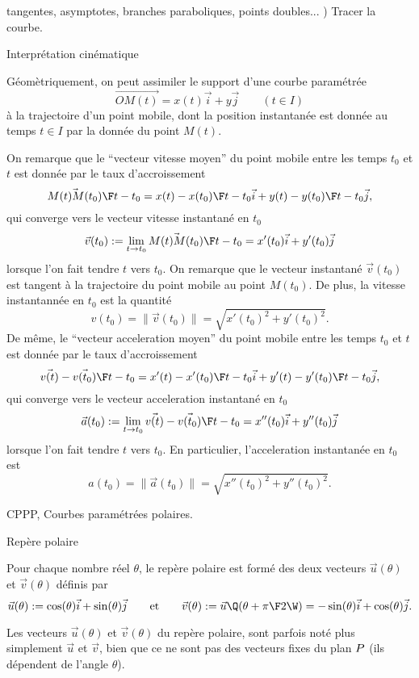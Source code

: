 \noindent\quad tangentes, asymptotes, branches paraboliques, points doubles...
\medskip
{}) Tracer la courbe.

\bigskip
\Concept [] Interprétation cinématique

\noindent
Géomètriquement, on peut assimiler le support d'une courbe paramétrée
$$
\vec{OM(t)}=x(t)\vec i+y\vec j\qquad(t\in I)
$$
à la trajectoire d'un point mobile, dont la position instantanée est donnée au temps $t\in I$ par la donnée du point $M(t)$. 

\bigskip
\noindent
On remarque que le ``vecteur vitesse moyen'' du point mobile entre les temps $t_0$ et $t$ est donnée par le taux d'accroissement 
$$
{\vec{M(t)M(t_0)}\F t-t_0}={x(t)-x(t_0)\F t-t_0}\vec i+{y(t)-y(t_0)\F t-t_0}\vec j, 
$$
qui converge vers le vecteur vitesse instantané en $t_0$ 
$$
\vec v(t_0):=\lim_{t\to t_0}{\vec{M(t)M(t_0)}\F t-t_0}=x'(t_0)\vec i+y'(t_0)\vec j 
$$
lorsque l'on fait tendre $t$ vers $t_0$. \medskip
\noindent
On remarque que le vecteur instantané $\vec v(t_0)$ est tangent à la trajectoire du point mobile au point $M(t_0)$. 
De plus, la vitesse instantannée en $t_0$ est la quantité 
$$
v(t_0)=\|\vec v(t_0)\|=\sqrt{x'(t_0)^2+y'(t_0)^2}.
$$
De même, le ``vecteur acceleration moyen'' du point mobile entre les temps $t_0$ et $t$ est donnée par le taux d'accroissement 
$$
{\vec{v(t)}-\vec {v(t_0)}\F t-t_0}={x'(t)-x'(t_0)\F t-t_0}\vec i+{y'(t)-y'(t_0)\F t-t_0}\vec j, 
$$
qui converge vers le vecteur acceleration instantané en $t_0$ 
$$
\vec a(t_0):=\lim_{t\to t_0}{\vec{v(t)}-\vec {v(t_0)}\F t-t_0}=x''(t_0)\vec i+y''(t_0)\vec j 
$$
lorsque l'on fait tendre $t$ vers $t_0$. En particulier, l'acceleration instantanée en $t_0$ est 
$$
a(t_0)=\|\vec a(t_0)\|=\sqrt{x''(t_0)^2+y''(t_0)^2}.
$$
\bigskip

\Subsection CPPP, Courbes paramétrées polaires.

\Concept [] Repère polaire

\noindent
Pour chaque nombre réel $\theta$, le repère polaire est formé des deux vecteurs $\vec u(\theta)$ et $\vec v(\theta)$ définis par 
$$
\vec u(\theta):=\cos(\theta)\vec i+\sin(\theta)\vec j\qquad\mbox{et}\qquad\vec v(\theta):=\vec u\Q(\theta+{\pi\F2}\W)=-\sin(\theta)\vec i+\cos(\theta)\vec j. 
$$

 Les vecteurs $\vec u(\theta)$ et $\vec v(\theta)$ du repère polaire, sont parfois noté plus simplement $\vec u$ et $\vec v$, bien que ce ne sont pas 
des vecteurs fixes du plan $\sc P$ (ils dépendent de l'angle $\theta$). 
\bigskip

